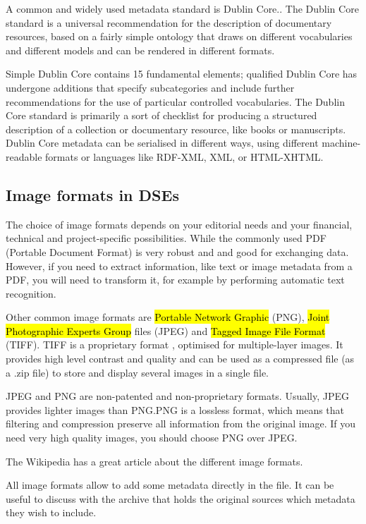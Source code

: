 \documentclass[
  letterpaper,
  DIV=11,
  numbers=noendperiod]{scrreprt}
\begin{document}
A common and widely used metadata standard is Dublin Core.. The Dublin
Core standard is a universal recommendation for the description of
documentary resources, based on a fairly simple ontology that draws on
different vocabularies and different models and can be rendered in
different formats.

Simple Dublin Core contains 15 fundamental elements; qualified Dublin
Core has undergone additions that specify subcategories and include
further recommendations for the use of particular controlled
vocabularies. The Dublin Core standard is primarily a sort of checklist
for producing a structured description of a collection or documentary
resource, like books or manuscripts. Dublin Core metadata can be
serialised in different ways, using different machine-readable formats
or languages like RDF-XML, XML, or HTML-XHTML.

\subsection{Image formats in DSEs}\label{image-formats-in-dses}

The choice of image formats depends on your editorial needs and your
financial, technical and project-specific possibilities. While the
commonly used PDF (Portable Document Format) is very robust and and good
for exchanging data. However, if you need to extract information, like
text or image metadata from a PDF, you will need to transform it, for
example by performing automatic text recognition.

Other common image formats are \hl{Portable Network Graphic} (PNG),
\hl{Joint Photographic Experts Group} files (JPEG) and \hl{Tagged Image
File Format} (TIFF). TIFF is a proprietary format , optimised for
multiple-layer images. It provides high level contrast and quality and
can be used as a compressed file (as a .zip file) to store and display
several images in a single file.

JPEG and PNG are non-patented and non-proprietary formats. Usually, JPEG
provides lighter images than PNG.PNG is a lossless format, which means
that filtering and compression preserve all information from the
original image. If you need very high quality images, you should choose
PNG over JPEG.

The Wikipedia has a great article about the different image formats.

All image formats allow to add some metadata directly in the file. It
can be useful to discuss with the archive that holds the original
sources which metadata they wish to include.
\end{document}
